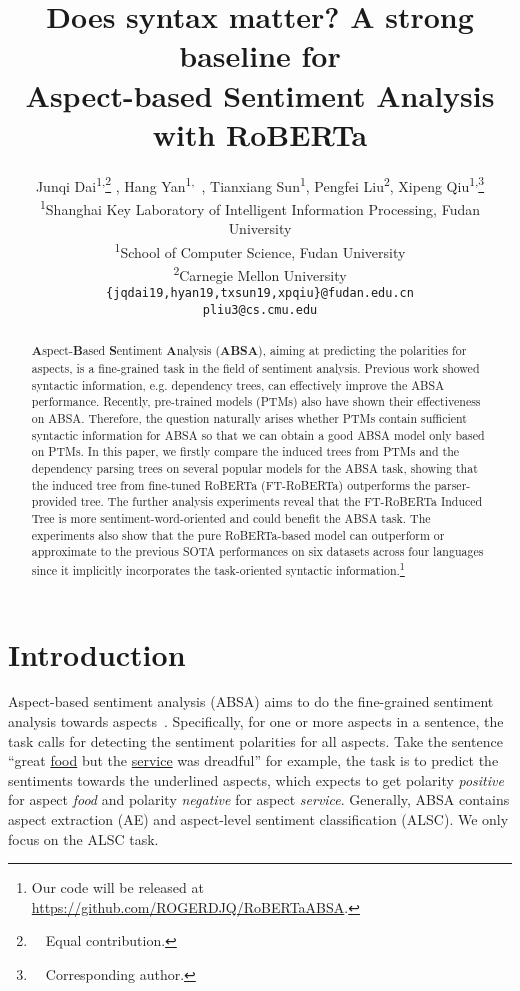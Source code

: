 \documentclass[11pt]{article}
\title{Does syntax matter? A strong baseline for\\ Aspect-based Sentiment Analysis  with RoBERTa}
\author{Junqi Dai\textsuperscript{1,}\thanks{\ \  Equal contribution.} , Hang Yan\textsuperscript{1,}\samethanks \ , Tianxiang Sun\textsuperscript{1}, Pengfei Liu\textsuperscript{2}, Xipeng Qiu\textsuperscript{1,}\thanks{\ \  Corresponding author.} \\
  \textsuperscript{1}Shanghai Key Laboratory of Intelligent Information Processing, Fudan University \\
  \textsuperscript{1}School of Computer Science, Fudan University \\
  \textsuperscript{2}Carnegie Mellon University \\

  \texttt{\{jqdai19,hyan19,txsun19,xpqiu\}@fudan.edu.cn}\\
  \texttt{pliu3@cs.cmu.edu}\\}
\begin{document}
\maketitle

\begin{abstract}
  \textbf{A}spect-\textbf{B}ased \textbf{S}entiment \textbf{A}nalysis (\textbf{ABSA}), aiming at predicting the polarities for aspects, is a fine-grained task in the field of sentiment analysis. Previous work showed syntactic information, e.g.  dependency trees, can effectively improve the ABSA performance.
Recently, pre-trained models (PTMs) also have shown their effectiveness on ABSA. Therefore, the question naturally arises whether PTMs contain sufficient syntactic information for ABSA so that we can obtain a good ABSA model only based on PTMs. In this paper, we firstly compare the induced trees from PTMs and the dependency parsing trees on several popular models for the ABSA task, showing that the induced tree from fine-tuned RoBERTa (FT-RoBERTa) outperforms the parser-provided tree. The further analysis experiments reveal that the FT-RoBERTa Induced Tree is more sentiment-word-oriented and could benefit the ABSA task. The experiments also show that the pure RoBERTa-based model can outperform or approximate to the previous SOTA performances on six datasets across four languages since it implicitly incorporates the task-oriented syntactic information.\footnote{Our code will be released at \url{https://github.com/ROGERDJQ/RoBERTaABSA}.}

\end{abstract}

\section{Introduction}
\label{sec:intro}
Aspect-based sentiment analysis (ABSA) aims to do the fine-grained sentiment analysis towards aspects~\citep{DBLP:conf/semeval/PontikiGPPAM14,DBLP:conf/semeval/PontikiGPAMAAZQ16}. Specifically, for one or more aspects in a sentence, the  task calls for detecting the sentiment polarities for all aspects. Take the sentence ``great \underline{food} but the \underline{service} was dreadful'' for example, the task is to predict the sentiments towards the underlined aspects, which expects to get polarity \emph{positive} for aspect \emph{food} and polarity \emph{negative} for aspect \emph{service}. Generally, ABSA contains aspect extraction (AE) and aspect-level sentiment classification (ALSC). We only focus on the ALSC task.
\end{document}
